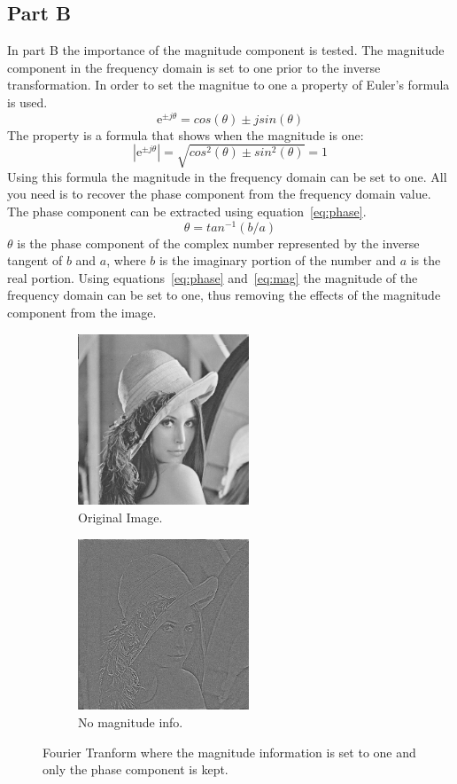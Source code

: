 \documentclass[letter]{article}
\begin{document}
\subsection{Part B}
In part B the importance of the magnitude component is tested. The magnitude component in the frequency domain is set to one prior to the inverse transformation. In order to set the magnitue to one a property of Euler's formula is used.
\begin{equation}
\mathrm{e}^{\pm j\theta} = cos(\theta) \pm j sin(\theta)
\end{equation}
The property is a formula that shows when the magnitude is one:
\begin{equation}
|\mathrm{e}^{\pm j\theta}| = \sqrt{cos^{2}(\theta) \pm sin^{2}(\theta)} = 1
\label{eq:mag}
\end{equation}
Using this formula the magnitude in the frequency domain can be set to one. All you need is to recover the phase component from the frequency domain value. The phase component can be extracted using equation~\ref{eq:phase}.
\begin{equation}
 \theta = tan^{-1}(b/a)
 \label{eq:phase}
\end{equation}
$\theta$ is the phase component of the complex number represented by the inverse tangent of $b$ and $a$, where $b$ is the imaginary portion of the number and $a$ is the real portion. Using equations~\ref{eq:phase} and~\ref{eq:mag} the magnitude of the frequency domain can be set to one, thus removing the effects of the magnitude component from the image.

\begin{figure}[hbtp]
  \centering
  \begin{subfigure}{5.1cm}
    \includegraphics[width=5.1cm]{images/lenna.png}
    \caption{Original Image.}
  \end{subfigure}
  \begin{subfigure}{5.1cm}
    \includegraphics[width=5.1cm]{images/lenna_phase_only.png}
    \caption{No magnitude info.}
  \end{subfigure}
  \caption{Fourier Tranform where the magnitude information is set to one and only the phase component is kept.}
  \label{fig:ft_phase}
\end{figure}
\end{document}
